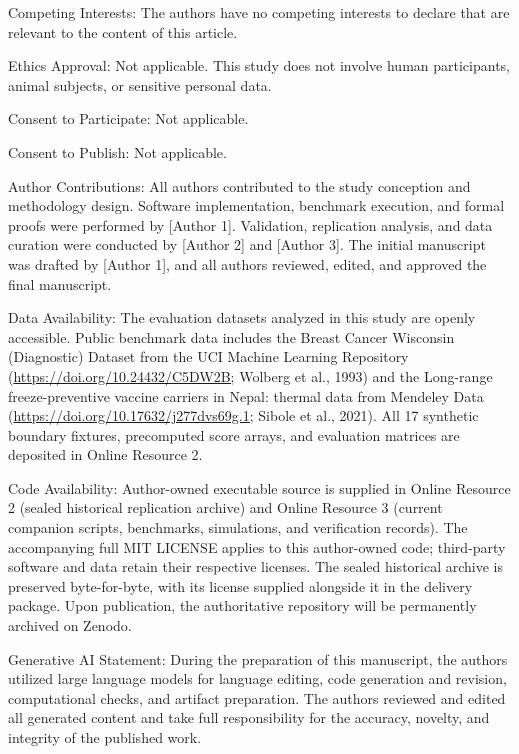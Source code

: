 \documentclass[11pt,a4paper]{article}
\begin{document}
Competing Interests: The authors have no competing interests to declare that are relevant to the content of this article.



Ethics Approval: Not applicable. This study does not involve human participants, animal subjects, or sensitive personal data.



Consent to Participate: Not applicable.



Consent to Publish: Not applicable.



Author Contributions: All authors contributed to the study conception and methodology design. Software implementation, benchmark execution, and formal proofs were performed by [Author 1]. Validation, replication analysis, and data curation were conducted by [Author 2] and [Author 3]. The initial manuscript was drafted by [Author 1], and all authors reviewed, edited, and approved the final manuscript.



Data Availability: The evaluation datasets analyzed in this study are openly accessible. Public benchmark data includes the Breast Cancer Wisconsin (Diagnostic) Dataset from the UCI Machine Learning Repository (\url{https://doi.org/10.24432/C5DW2B;} Wolberg et al., 1993) and the Long-range freeze-preventive vaccine carriers in Nepal: thermal data from Mendeley Data (\url{https://doi.org/10.17632/j277dvs69g.1;} Sibole et al., 2021). All 17 synthetic boundary fixtures, precomputed score arrays, and evaluation matrices are deposited in Online Resource 2.



Code Availability: Author-owned executable source is supplied in Online Resource 2 (sealed historical replication archive) and Online Resource 3 (current companion scripts, benchmarks, simulations, and verification records). The accompanying full MIT LICENSE applies to this author-owned code; third-party software and data retain their respective licenses. The sealed historical archive is preserved byte-for-byte, with its license supplied alongside it in the delivery package. Upon publication, the authoritative repository will be permanently archived on Zenodo.



Generative AI Statement: During the preparation of this manuscript, the authors utilized large language models for language editing, code generation and revision, computational checks, and artifact preparation. The authors reviewed and edited all generated content and take full responsibility for the accuracy, novelty, and integrity of the published work.
\end{document}
